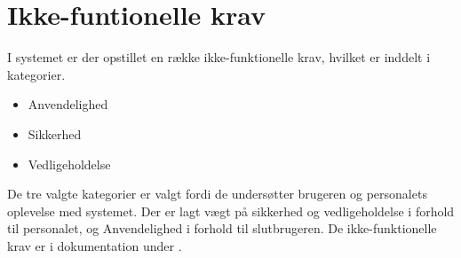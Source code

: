 \section{Ikke-funtionelle krav}

I systemet er der opstillet en række ikke-funktionelle krav, hvilket er inddelt i kategorier.

\begin{itemize}
  \item Anvendelighed
  \item Sikkerhed
  \item Vedligeholdelse
\end{itemize}

De tre valgte kategorier er valgt fordi de undersøtter brugeren og personalets oplevelse med systemet. Der er lagt vægt på sikkerhed og vedligeholdelse i forhold til personalet, og Anvendelighed i forhold til slutbrugeren. De ikke-funktionelle krav er i dokumentation under .